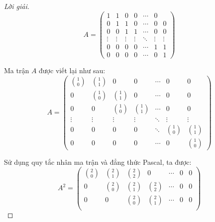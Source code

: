 \documentclass[class=linearalgebra,crop=false]{standalone}
\begin{document}
\begin{proof}[Lời giải]
    \[
        A =
        \begin{pmatrix}
            1      & 1      & 0      & 0      & \cdots & 0               \\
            0      & 1      & 1      & 0      & \cdots & 0      & 0      \\
            0      & 0      & 1      & 1      & \cdots & 0      & 0      \\
            \vdots & \vdots & \vdots & \vdots & \ddots & \vdots & \vdots \\
            0      & 0      & 0      & 0      & \cdots & 1      & 1      \\
            0      & 0      & 0      & 0      & \cdots & 0      & 1
        \end{pmatrix}
    \]
    \par Ma trận $A$ được viết lại như sau:
    \[
        A =
        \begin{pmatrix}
            \binom{1}{0} & \binom{1}{1} & 0            & 0            & \cdots & 0            & 0            \\
            0            & \binom{1}{0} & \binom{1}{1} & 0            & \cdots & 0            & 0            \\
            0            & 0            & \binom{1}{0} & \binom{1}{1} & \cdots & 0            & 0            \\
            \vdots       & \vdots       & \vdots       & \vdots       & \ddots & \vdots       & \vdots       \\
            0            & 0            & 0            & 0            & \ddots & \binom{1}{0} & \binom{1}{1} \\
            0            & 0            & 0            & 0            & \cdots & 0            & \binom{1}{0}
        \end{pmatrix}
    \]
    \par Sử dụng quy tắc nhân ma trận và đẳng thức Pascal, ta được:
    \[
        A^{2} =
        \begin{pmatrix}
            \binom{2}{0} & \binom{2}{1} & \binom{2}{2} & 0            & \cdots & 0            & 0            \\
            0            & \binom{2}{0} & \binom{2}{1} & \binom{2}{2} & \cdots & 0            & 0            \\
            0            & 0            & \binom{2}{0} & \binom{2}{1} & \cdots & 0            & 0            \\

\end{pmatrix}\]
\end{proof}
\end{document}
